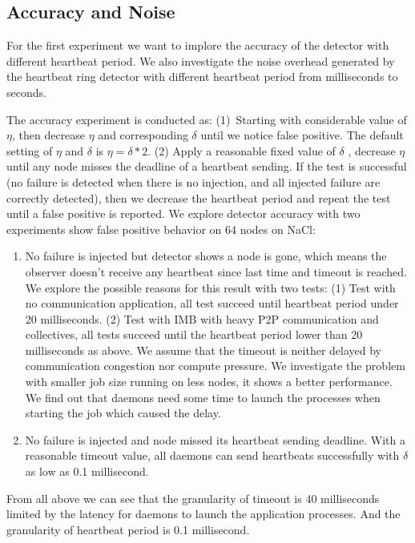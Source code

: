 \documentclass[sigconf]{acmart}
\newcommand{\imb}[0]{\textsc{IMB}\xspace}
\begin{document}
\subsection{Accuracy and Noise}
For the first experiment we want to implore the accuracy of the detector with different heartbeat period. We also investigate the noise overhead generated by the heartbeat ring detector with different heartbeat period from milliseconds to seconds.

The accuracy experiment is conducted as: (1)\ Starting with considerable value of $ \eta $, then decrease $ \eta $ and corresponding $ \delta $ until we notice false positive. The default setting of $ \eta $ and $ \delta $ is $ \eta = \delta * 2 $. (2) Apply a reasonable fixed value of  $ \delta $ , decrease  $ \eta $ until any node misses the deadline of a heartbeat sending.   If the test is successful (no failure is detected when there is no injection, and all injected failure are correctly detected), then we decrease the heartbeat period and repeat the test until a false positive is reported. We explore detector accuracy with two experiments show false positive behavior on 64 nodes on NaCl: 
\begin{enumerate}
  \item No failure is injected but detector shows a node is gone, which means the observer doesn't receive any heartbeat since last time and timeout is reached. We explore the possible reasons for this result with two tests: (1) Test with no communication application, all test succeed until heartbeat period under 20 milliseconds. (2) Test with \imb with heavy P2P communication and collectives, all tests succeed until the heartbeat period lower than 20 milliseconds as above. We assume that the timeout is neither delayed by communication congestion nor compute pressure. We investigate the problem with smaller job size running on less nodes, it shows a better performance. We find out that daemons need some time to launch the processes when starting the job which caused the delay. 
  \item No failure is injected and node missed its heartbeat sending deadline. With a reasonable timeout value, all daemons can send heartbeats successfully with $ \delta $ as low as 0.1 millisecond. 
\end{enumerate}

From all above we can see that the granularity of timeout is 40 milliseconds limited by the latency for daemons to launch the application processes. And the granularity of heartbeat period is 0.1 millisecond.  
\end{document}
